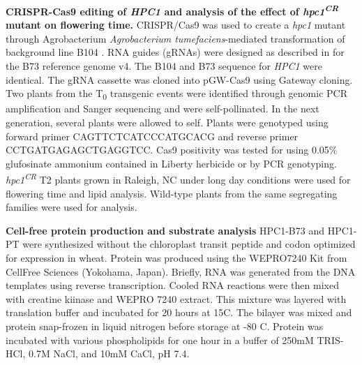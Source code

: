 \documentclass[9pt,twocolumn,twoside,lineno]{biorxiv}
\begin{document}
\textbf{CRISPR-Cas9 editing of \textit{HPC1} and analysis of the effect of \textit{hpc1\textsuperscript{CR}} mutant on flowering time.}
CRISPR/Cas9 was used to create a \textit{hpc1} mutant through Agrobacterium \textit{Agrobacterium tumefaciens}-mediated transformation of background line B104 \cite{Wu2020-nq, Char2017-uk}. 
RNA guides (gRNAs) were designed as described in \cite{Brazelton2015-co} for the B73 reference genome v4. 
The B104 and B73 sequence for \textit{HPC1} were identical. 
The gRNA cassette was cloned into pGW-Cas9 using Gateway cloning. 
Two plants from the T\textsubscript{0} transgenic events were identified through genomic PCR amplification and Sanger sequencing and were self-pollinated. 
In the next generation, several plants were allowed to self.
Plants were genotyped using forward primer CAGTTCTCATCCCATGCACG and reverse primer CCTGATGAGAGCTGAGGTCC.
Cas9 positivity was tested for using 0.05\% glufosinate ammonium contained in Liberty herbicide or by PCR genotyping. 
\textit{hpc1\textsuperscript{CR}} T2 plants grown in Raleigh, NC under long day conditions were used for flowering time and lipid analysis.
Wild-type plants from the same segregating families were used for analysis.

\textbf{Cell-free protein production and substrate analysis}
HPC1-B73 and HPC1-PT were synthesized without the chloroplast transit peptide and codon optimized for expression in wheat. 
Protein was produced using the WEPRO7240 Kit from CellFree Sciences (Yokohama, Japan).
Briefly, RNA was generated from the DNA templates using reverse transcription. 
Cooled RNA reactions were then mixed with creatine kiinase and WEPRO 7240 extract. 
This mixture was layered with translation buffer and incubated for 20 hours at 15\textdegree C.
The bilayer was mixed and protein snap-frozen in liquid nitrogen before storage at -80 \textdegree C.
Protein was incubated with various phospholipids for one hour in a buffer of 250mM TRIS-HCl, 0.7M NaCl, and 10mM CaCl, pH 7.4.
\end{document}
